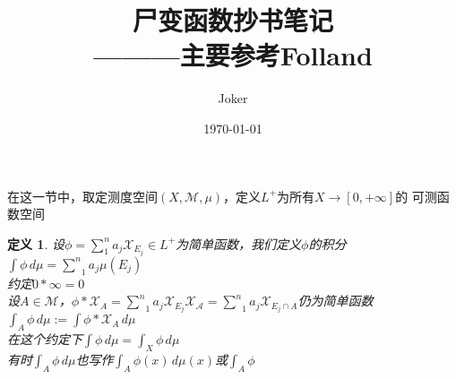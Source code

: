 \documentclass[12pt, a4paper, oneside]{ctexbook}
\title{{\Huge{\textbf{尸变函数抄书笔记}}}\\———主要参考Folland}
\author{Joker}
\date{\today}
\newtheorem{definition}[theorem]{定义}
\begin{document}
在这一节中，取定测度空间$(X,\mathcal{M},\mu)$，定义$L^+$为所有$X\to[0,+\infty]$的
可测函数空间
\begin{definition}
    设$\phi=\sum_1^na_j\mathcal{X}_{E_j}\in L^+$为简单函数，我们定义$\phi$的积分\\
    $\int\phi\,d\mu=\underset{1}{\overset{n}{\sum}}a_j\mu(E_j)$\\
    约定$0*\infty=0$\\
    设$A\in\mathcal{M}$，$\phi*\mathcal{X}_A=\underset{1}{\overset{n}{\sum}}a_j\mathcal{X}_{E_j}\mathcal{X_A}=\underset{1}{\overset{n}{\sum}}a_j\mathcal{X}_{E_j\cap A}$仍为简单函数\\
    $\int_{A}\phi\,d\mu:=\int\phi*\mathcal{X}_A\,d\mu$\\
    在这个约定下$\int\phi\,d\mu=\int_X\phi\,d\mu$\\
    有时$\int_A\phi\,d\mu$也写作$\int_A\phi(x)\,d\mu(x)$或$\int_A\phi$
\end{definition}
\end{document}
